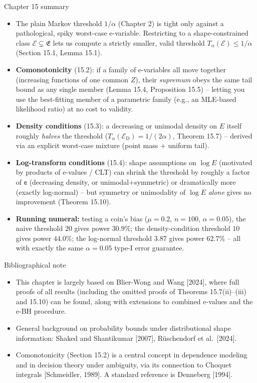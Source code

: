 \documentclass[aspectratio=169,10pt]{beamer}
\newcommand{\calE}{\mathcal{E}}
\newcommand{\frakE}{\mathfrak{E}}
\newcommand{\ED}{\mathcal{E}_{\mathrm{D}}}
\begin{document}
\begin{frame}{Chapter 15 summary}
  \begin{itemize}
    \item The plain Markov threshold $1/\alpha$ (Chapter 2) is tight only against a pathological, spiky worst-case e-variable. Restricting to a shape-constrained class $\calE\subsetneq\frakE$ lets us compute a strictly smaller, valid threshold $T_\alpha(\calE)\le1/\alpha$ (Section 15.1, Lemma 15.1).
    \item \textbf{Comonotonicity} (15.2): if a family of e-variables all move together (increasing functions of one common $Z$), their \emph{supremum} obeys the same tail bound as any single member (Lemma 15.4, Proposition 15.5) -- letting you use the best-fitting member of a parametric family (e.g., an MLE-based likelihood ratio) at no cost to validity.
    \item \textbf{Density conditions} (15.3): a decreasing or unimodal density on $E$ itself roughly \emph{halves} the threshold ($T_\alpha(\ED)=1/(2\alpha)$, Theorem 15.7) -- derived via an explicit worst-case mixture (point mass $+$ uniform tail).
    \item \textbf{Log-transform conditions} (15.4): shape assumptions on $\log E$ (motivated by products of e-values / CLT) can shrink the threshold by roughly a factor of $\mathsf{e}$ (decreasing density, or unimodal+symmetric) or dramatically more (exactly log-normal) -- but symmetry or unimodality of $\log E$ \emph{alone} gives no improvement (Theorem 15.10).
    \item \textbf{Running numeral:} testing a coin's bias ($\mu=0.2$, $n=100$, $\alpha=0.05$), the naive threshold $20$ gives power $30.9\%$; the density-condition threshold $10$ gives power $44.0\%$; the log-normal threshold $3.87$ gives power $62.7\%$ -- all with exactly the same $\alpha=0.05$ type-I error guarantee.
  \end{itemize}
\end{frame}

\begin{frame}{Bibliographical note}
  \begin{itemize}
    \item This chapter is largely based on Blier-Wong and Wang [2024], where full proofs of all results (including the omitted proofs of Theorems 15.7(ii)--(iii) and 15.10) can be found, along with extensions to combined e-values and the e-BH procedure.
    \item General background on probability bounds under distributional shape information: Shaked and Shantikumar [2007], R\"uschendorf et al.\ [2024].
    \item Comonotonicity (Section 15.2) is a central concept in dependence modeling and in decision theory under ambiguity, via its connection to Choquet integrals [Schmeidler, 1989]. A standard reference is Denneberg [1994].
  \end{itemize}
\end{frame}
\end{document}
